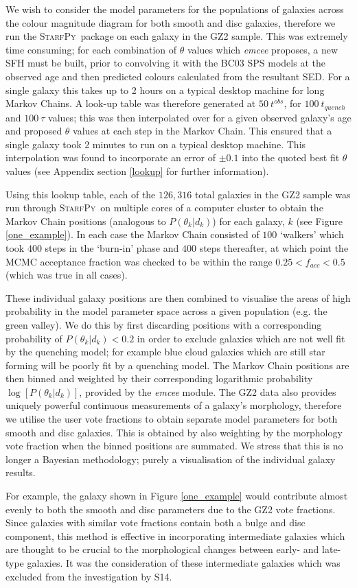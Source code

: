 \documentclass[useAMS,usenatbib]{mn2e}
\def\changed    {\color{titlecol} }
\def\newchange {\color{change} }
\def\starfpy {\textsc{StarfPy}}
\begin{document}
{\changed We wish to consider the model parameters for the populations of galaxies across the colour magnitude diagram for both smooth and disc galaxies, therefore we run the \starfpy ~package on each galaxy in the GZ2 sample. This was extremely time consuming; for each combination of $\theta$ values which \emph{emcee} proposes, a new SFH must be built, prior to convolving it with the BC03 SPS models at the observed age and then predicted colours calculated from the resultant SED. For a single galaxy this takes up to 2 hours on a typical desktop machine for long Markov Chains. A look-up table was therefore generated at $50 ~t^{obs}$, for $100 ~t_{quench}$ and $100 ~\tau$ values; this was then interpolated over for a given observed galaxy's age and proposed $\theta$ values at each step in the Markov Chain. This ensured that a single galaxy took 2 minutes to run on a typical desktop machine. This interpolation was found to incorporate an error of $\pm 0.1$ into the quoted best fit $\theta$ values (see Appendix section \ref{lookup} for further information). 

Using this lookup table, each of the $126,316$ total galaxies in the GZ2 sample was run through \starfpy ~on multiple cores of a computer cluster to obtain the Markov Chain positions (analogous to $P(\theta_k|d_k)$) for each galaxy, $k$ (see Figure \ref{one_example}). In each case the Markov Chain consisted of $100$ `walkers' which took $400$ steps in the `burn-in' phase and $400$ steps thereafter, at which point the MCMC acceptance fraction was checked to be within the range $0.25 < f_{acc} < 0.5$ (which was true in all cases). }

{\newchange These individual galaxy positions are then combined to visualise the areas of high probability in the model parameter space across a given population (e.g. the green valley). We do this by first discarding positions with a corresponding probability of $P(\theta_k|d_k) < 0.2$ in order to exclude galaxies which are not well fit by the quenching model; for example blue cloud galaxies which are still star forming will be poorly fit by a quenching model. The Markov Chain positions are then binned and weighted by their corresponding logarithmic probability $\log [P(\theta_k|d_k)]$, provided by the \emph{emcee} module. The GZ2 data also provides uniquely powerful continuous measurements of a galaxy's morphology, therefore we utilise the user vote fractions to obtain separate model parameters for both smooth and disc galaxies. This is obtained by also weighting by the morphology vote fraction when the binned positions are summated. We stress that this is no longer a Bayesian methodology; purely a visualisation of the individual galaxy results.

For example, the galaxy shown in Figure \ref{one_example} would contribute almost evenly to both the smooth and disc parameters due to the GZ2 vote fractions. Since galaxies with similar vote fractions contain both a bulge and disc component, this method is effective in incorporating intermediate galaxies which are thought to be crucial to the morphological changes between early- and late-type galaxies. It was the consideration of these intermediate galaxies which was excluded from the investigation by S14.}
\end{document}
